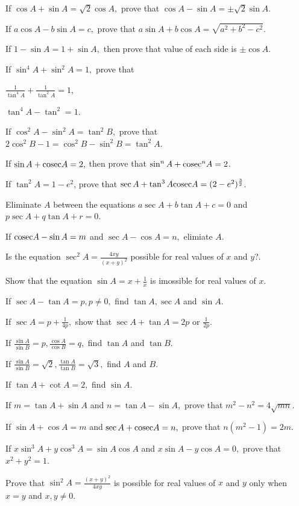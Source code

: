   \stopitemize
\item If $\cos A + \sin A = \sqrt{2}\cos A,$ prove that $\cos A - \sin A = \pm \sqrt{2}\sin A$.
\item If $a\cos A - b\sin A = c,$ prove that $a\sin A + b\cos A = \sqrt{a^2 + b ^2 - c^2}$.
\item If $1 - \sin A = 1 + \sin A,$ then prove that value of each side is $\pm \cos A$.
\item If $\sin^4 A + \sin^2 A = 1,$ prove that
  \startitemize[i]
    \item $\frac{1}{\tan^4 A} + \frac{1}{\tan^2A} = 1$,
    \item $\tan^4A - \tan^2 = 1$.
  \stopitemize
\item If $\cos^2A - \sin^2 A = \tan^2 B,$ prove that $2\cos^2B - 1 = \cos^2B - \sin^2B = \tan^2A$.
\item If $\sin A + {\rm cosec} A = 2,$ then prove that $\sin^nA + {\rm cosec}^nA = 2$.
\item If $\tan^2A = 1 - e^2$, prove that $\sec A + \tan^3A {\rm cosec}A = (2 - e^2)^{\frac{3}{2}}$.
\item Eliminate $A$ between the equations $a\sec A + b\tan A + c = 0$ and $p\sec A + q\tan A + r = 0$.
\item If ${\rm cosec} A - \sin A = m$ and $\sec A - \cos A = n,$ elimiate $A$.
\item Is the equation $\sec^2 A = \frac{4xy}{(x + y)^2}$ possible for real values of $x$ and $y$?.
\item Show that the equation $\sin A = x + \frac{1}{x}$ is imossible for real values of $x$.
\item If $\sec A - \tan A = p, p\neq 0,$ find $\tan A, \sec A$ and $\sin A$.
\item If $\sec A = p + \frac{1}{4p},$ show that $\sec A + \tan A = 2p$ or $\frac{1}{2p}$.
\item If $\frac{\sin A}{\sin B} = p, \frac{\cos A}{\cos B} = q,$ find $\tan A$ and $\tan B$.
\item If $\frac{\sin A}{\sin B} = \sqrt{2}, \frac{\tan A}{\tan B}= \sqrt{3},$ find $A$ and $B$.
\item If $\tan A + \cot A = 2,$ find $\sin A$.
\item If $m = \tan A + \sin A$ and $n = \tan A - \sin A,$ prove that $m^2 - n^2 = 4\sqrt{mn}$.
\item If $\sin A + \cos A = m$ and $\sec A + {\rm cosec} A = n,$ prove that $n(m^2 - 1) = 2m$.
\item If $x\sin^3 A + y\cos^3 A = \sin A\cos A$ and $x\sin A - y\cos A = 0,$ prove that $x^2 + y^2 = 1$.
\item Prove that $\sin^2A = \frac{(x + y)^2}{4xy}$ is possible for real values of $x$ and $y$ only when $x =
    y$ and $x,y \neq 0$.
\stopitemize

